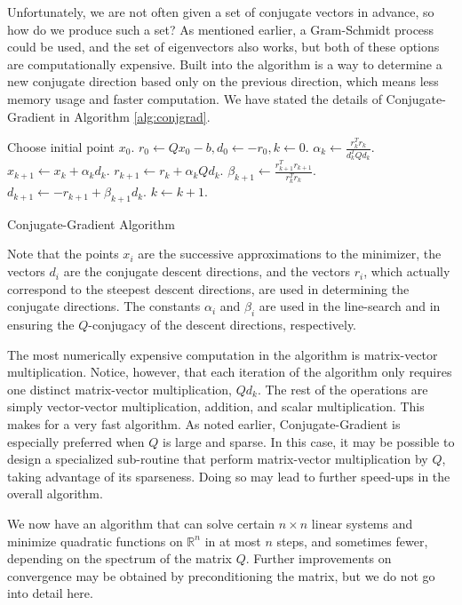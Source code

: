 Unfortunately, we are not often given a set of conjugate vectors in advance, so how do we produce such a set? As mentioned earlier, a
Gram-Schmidt process could be used, and the set of eigenvectors also works, but both of these options are computationally expensive.
Built into the algorithm is a way to determine a new conjugate direction based only on the previous direction, which means less memory usage and
faster computation. We have stated the details of Conjugate-Gradient in Algorithm \ref{alg:conjgrad}.
\begin{algorithm}
\begin{algorithmic}[1]
    \State \textrm{Choose initial point } $x_0$.
    \State $r_0 \gets Qx_0 - b, d_0 \gets -r_0, k \gets 0$.
        \State $\alpha_k \gets \frac{r_k^Tr_k}{d_k^TQd_k}$.
        \State $x_{k+1} \gets x_k + \alpha_kd_k$.
        \State $r_{k+1} \gets r_k + \alpha_kQd_k$.
        \State $\beta_{k+1} \gets \frac{r_{k+1}^Tr_{k+1}}{r_k^Tr_k}$.
        \State $d_{k+1} \gets -r_{k+1} + \beta_{k+1}d_k$.
        \State $k \gets k+1$.
    \EndWhile
\EndProcedure
\end{algorithmic}
\caption{Conjugate-Gradient Algorithm}
\label{alg:conjgrad}
\end{algorithm}

Note that the points $x_i$ are the successive approximations to the minimizer, the vectors $d_i$ are the conjugate descent
directions, and the vectors $r_i$, which actually correspond to the steepest descent directions, are used in determining the conjugate directions.
The constants $\alpha_i$ and $\beta_i$ are used in the line-search and in ensuring the $Q$-conjugacy of the descent directions, respectively.

The most numerically expensive computation in the algorithm is matrix-vector multiplication.
Notice, however, that each iteration of the algorithm only requires one distinct matrix-vector multiplication, $Qd_k$. The rest of the
operations are simply vector-vector multiplication, addition, and scalar multiplication. This makes for a very fast algorithm.
As noted earlier, Conjugate-Gradient is especially preferred when $Q$ is large and sparse. In this case, it may be possible to
design a specialized sub-routine that perform matrix-vector multiplication by $Q$, taking advantage of its sparseness. Doing so may
lead to further speed-ups in the overall algorithm.

We now have an algorithm that can solve certain $n \times n$ linear systems and minimize quadratic functions on $\mathbb{R}^n$ in at most $n$ steps,
and sometimes fewer, depending on the spectrum of the matrix $Q$. Further improvements on convergence may be obtained by preconditioning the matrix,
but we do not go into detail here.

